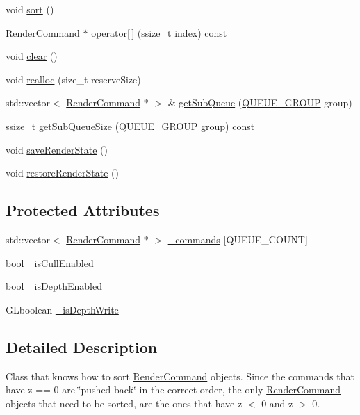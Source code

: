 \begin{DoxyCompactItemize}
\item 
void \hyperlink{classRenderQueue_a5dce2ab80620ec15c36ccdf2da1fd87a}{sort} ()
\item 
\hyperlink{classRenderCommand}{Render\+Command} $\ast$ \hyperlink{classRenderQueue_adf360589819adb5ec72a950d20d2ae22}{operator\mbox{[}$\,$\mbox{]}} (ssize\+\_\+t index) const
\item 
void \hyperlink{classRenderQueue_a8f4c44eedd6d9cc788100022ed725568}{clear} ()
\item 
void \hyperlink{classRenderQueue_a6a9e1c224b1c5d3c7ac92f9a3e14f23c}{realloc} (size\+\_\+t reserve\+Size)
\item 
std\+::vector$<$ \hyperlink{classRenderCommand}{Render\+Command} $\ast$ $>$ \& \hyperlink{classRenderQueue_af6486c291c439094adcd12d197a8f200}{get\+Sub\+Queue} (\hyperlink{classRenderQueue_a546a6ca0aa906f2fd8f86c698c76854e}{Q\+U\+E\+U\+E\+\_\+\+G\+R\+O\+UP} group)
\item 
ssize\+\_\+t \hyperlink{classRenderQueue_a0e2d32f2bb26fac3c08b6a7e8d827b04}{get\+Sub\+Queue\+Size} (\hyperlink{classRenderQueue_a546a6ca0aa906f2fd8f86c698c76854e}{Q\+U\+E\+U\+E\+\_\+\+G\+R\+O\+UP} group) const
\item 
void \hyperlink{classRenderQueue_a69e89af620d29b96de300710c39ea293}{save\+Render\+State} ()
\item 
void \hyperlink{classRenderQueue_a232643cb44bd75fd6ebdc5ef85ad4460}{restore\+Render\+State} ()
\end{DoxyCompactItemize}
\subsection*{Protected Attributes}
\begin{DoxyCompactItemize}
\item 
std\+::vector$<$ \hyperlink{classRenderCommand}{Render\+Command} $\ast$ $>$ \hyperlink{classRenderQueue_ae188745e0ea9c53f8e4f5027d3f0ceb2}{\+\_\+commands} \mbox{[}Q\+U\+E\+U\+E\+\_\+\+C\+O\+U\+NT\mbox{]}
\item 
bool \hyperlink{classRenderQueue_a559ae66cabf2fe661c2d32d9f1ea77c7}{\+\_\+is\+Cull\+Enabled}
\item 
bool \hyperlink{classRenderQueue_a6ee087bd3171e79953ceca457f2c58e1}{\+\_\+is\+Depth\+Enabled}
\item 
G\+Lboolean \hyperlink{classRenderQueue_af8a6675da62368094d61396ef6987877}{\+\_\+is\+Depth\+Write}
\end{DoxyCompactItemize}


\subsection{Detailed Description}
Class that knows how to sort {\ttfamily \hyperlink{classRenderCommand}{Render\+Command}} objects. Since the commands that have {\ttfamily z == 0} are \char`\"{}pushed back\char`\"{} in the correct order, the only {\ttfamily \hyperlink{classRenderCommand}{Render\+Command}} objects that need to be sorted, are the ones that have {\ttfamily z $<$ 0} and {\ttfamily z $>$ 0}. 

